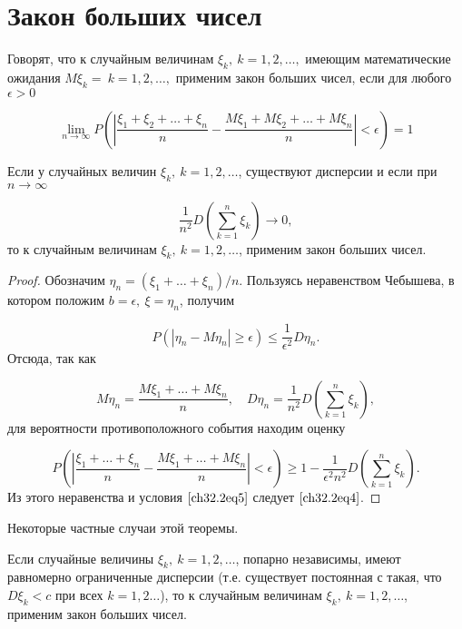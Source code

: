 \section{Закон больших чисел}

Говорят, что к случайным величинам $\xi_k, \: k = 1, 2, \ldots,$ имеющим математические ожидания $M\xi_k = \: k = 1, 2,\ldots,$ применим закон больших чисел, если для любого $\epsilon > 0$

\begin{equation} \label{ch32.2eq4}
\lim_{n \to \infty} P \left( \left| \frac{\xi_1 + \xi_2 + \ldots + \xi_n}{n} - \frac{M \xi_1 + M \xi_2 + \ldots + M \xi_n}{n} \right| < \epsilon \right) = 1
\end{equation}

\begin{thm} [Маркова]
Если у случайных величин $\xi_k, \: k = 1,2,\ldots$, существуют дисперсии и если при $n \to \infty$

\begin{equation} \label{ch32.2eq5}
\frac{1}{n^2} D  \left( \sum_{k  = 1}^{n} \xi_k\right) \to 0,
\end{equation}
то к случайным величинам $\xi_k, \: k = 1,2,\ldots$, применим закон больших чисел.
\end{thm}

\begin{proof}
Обозначим $\eta_n = (\xi_1 + \ldots + \xi_n) / n$. Пользуясь неравенством Чебышева, в котором положим $b = \epsilon, \: \xi = \eta_n$, получим

$$
P \left( \left| \eta_n - M  \eta_n \right| \ge \epsilon \right) \le \frac{1}{\epsilon^2} D  \eta_n.
$$
Отсюда, так как

$$
M  \eta_n = \frac{M \xi_1 + \ldots + M \xi_n}{n}, \quad D \eta_n = \frac{1}{n^2} D  \left( \sum_{k  = 1}^{n} \xi_k\right),
$$ 
для вероятности противоположного события находим оценку

$$
P \left( \left| \frac{\xi_1 + \ldots + \xi_n}{n} - \frac{M \xi_1 + \ldots + M \xi_n}{n} \right| < \epsilon \right) \ge 1 - \frac{1}{\epsilon^2n^2} D  \left( \sum_{k  = 1}^{n} \xi_k\right).
$$
Из этого неравенства и условия $\eqref{ch32.2eq5}$ следует $\eqref{ch32.2eq4}$.
\end{proof}

Некоторые частные случаи этой теоремы.

\begin{thm} [Чебышёва]
Если случайные величины $\xi_k, \: k = 1,2,\ldots$, попарно независимы, имеют равномерно ограниченные дисперсии (т.е. существует постоянная с такая, что $D  \xi_k < c$ при всех $k = 1, 2\ldots$),	то к случайным величинам $\xi_k, \: k = 1,2,\ldots$, применим закон больших чисел.
\end{thm}

